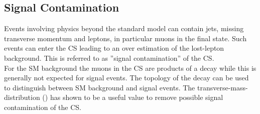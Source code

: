 \clearpage


\subsection{Signal Contamination}
\label{sec:signal_contamination}
Events involving physics beyond the standard model can contain jets, missing transverse momentum and leptons, in particular muons in the final state. Such events can enter the CS leading to an over estimation of the lost-lepton background. This is referred to as ''signal contamination'' of the CS.\\ 
For the SM background the muons in the CS are products of a \W decay while this is generally not expected for signal events. The topology of the \W decay can be used to distinguish between SM background and signal events.
The transverse-mass-distribution (\mt) has shown to be a useful value to remove possible signal contamination of the CS.\\

